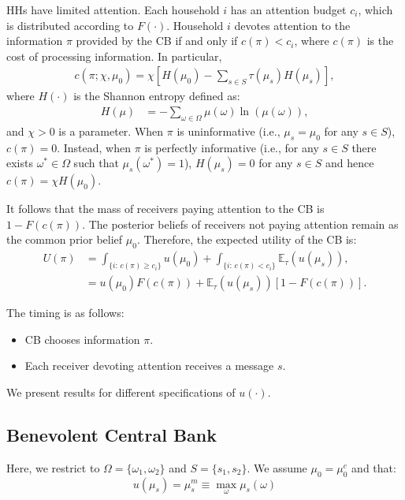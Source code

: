 \documentclass[12pt,a4paper]{article}
\begin{document}
HHs have limited attention. Each household $i$ has an attention budget $c_i$, which is distributed according to $F(\cdot)$. Household $i$ devotes attention to the information $\pi$ provided by the CB if and only if $c(\pi)<c_i$, where $c(\pi)$ is the cost of processing information. In particular,
\begin{align}
\label{cost}
    c(\pi; \chi, \mu_0) = \chi\left[H(\mu_0)-\sum_{s \in S}\tau(\mu_s) H(\mu_s)\right],
\end{align}
where $H(\cdot)$ is the Shannon entropy defined as:
\begin{align}
    H(\mu) & = -\sum_{\omega\in\Omega}\mu(\omega)\ln(\mu(\omega)),
\end{align}
and $\chi>0$ is a parameter. When $\pi$ is uninformative (i.e., $\mu_s = \mu_0$ for any $s\in S$), $c(\pi)=0$. Instead, when $\pi$ is perfectly informative (i.e., for any $s \in S$ there exists $\omega^* \in \Omega$ such that $\mu_s(\omega^*)=1$), $H(\mu_s)=0$ for any $s\in S$ and hence $c(\pi)=\chi H(\mu_0)$. 

It follows that the mass of receivers paying attention to the CB is $1-F(c(\pi))$. The posterior beliefs of receivers not paying attention remain as the common prior belief $\mu_0$. Therefore, the expected utility of the CB is:
\begin{align}
   U(\pi) & = \int_{\{i:\, c(\pi) \geq c_i\}} u(\mu_0) + \int_{\{i:\, c(\pi) < c_i\}} \mathbb{E}_\tau(u(\mu_s)), \\
   & = u(\mu_0)F(c(\pi)) + \mathbb{E}_\tau(u(\mu_s))[1-F(c(\pi))].
\end{align}

The timing is as follows:
\begin{itemize}
    \item CB chooses information $\pi$.
    \item Each receiver devoting attention receives a message $s$.
\end{itemize}
We present results for different specifications of $u(\cdot)$.

\subsection{Benevolent Central Bank}

Here, we restrict to $\Omega=\{\omega_1,\omega_2\}$ and $S=\{s_1,s_2\}$. We assume $\mu_0=\mu_0^c$ and that:
\begin{equation}
    u(\mu_s)=\mu_s^m\equiv\max_{\omega}\mu_s(\omega)
\end{equation}
\end{document}
